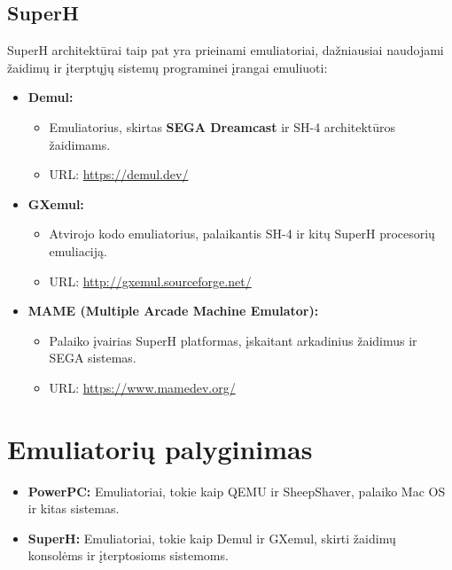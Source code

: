\documentclass{article}
\begin{document}
\subsection{SuperH}
SuperH architektūrai taip pat yra prieinami emuliatoriai, dažniausiai naudojami žaidimų ir įterptųjų sistemų programinei įrangai emuliuoti:

\begin{itemize}
    \item \textbf{Demul:}
        \begin{itemize}
            \item Emuliatorius, skirtas \textbf{SEGA Dreamcast} ir SH-4 architektūros žaidimams.
            \item URL: \url{https://demul.dev/}
        \end{itemize}
    \item \textbf{GXemul:}
        \begin{itemize}
            \item Atvirojo kodo emuliatorius, palaikantis SH-4 ir kitų SuperH procesorių emuliaciją.
            \item URL: \url{http://gxemul.sourceforge.net/}
        \end{itemize}
    \item \textbf{MAME (Multiple Arcade Machine Emulator):}
        \begin{itemize}
            \item Palaiko įvairias SuperH platformas, įskaitant arkadinius žaidimus ir SEGA sistemas.
            \item URL: \url{https://www.mamedev.org/}
        \end{itemize}
\end{itemize}

\section*{Emuliatorių palyginimas}
\begin{itemize}
    \item \textbf{PowerPC:} Emuliatoriai, tokie kaip QEMU ir SheepShaver, palaiko Mac OS ir kitas sistemas.
    \item \textbf{SuperH:} Emuliatoriai, tokie kaip Demul ir GXemul, skirti žaidimų konsolėms ir įterptosioms sistemoms.
\end{itemize}


 
\end{document}
